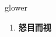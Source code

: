 
\begin{frame}
{\huge glower}
\begin{center}
\begin{enumerate}\Large
  \item \textbf{怒目而视}
\end{enumerate}
\end{center}
\end{frame}
